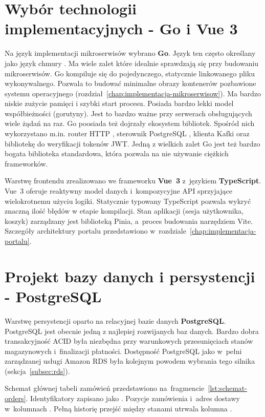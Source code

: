 \section{Wybór technologii implementacyjnych - Go i Vue 3}
\label{sec:wybor-technologii}

Na język implementacji mikroserwisów wybrano \textbf{Go}. Język ten często określany jako język chmury \parencite{medium}.
Ma wiele zalet które idealnie sprawdzają się przy budowaniu mikroserwisów. Go kompiluje się do pojedynczego,
statycznie linkowanego pliku wykonywalnego. Pozwala to budować minimalne obrazy kontenerów pozbawione systemu
operacyjnego (rozdział~\ref{chap:implementacja-mikroserwisow}). Ma bardzo niskie zużycie pamięci i szybki start procesu.
Posiada bardzo lekki model współbieżności (gorutyny). Jest to bardzo ważne przy serwerach obsługujących wiele żądań na raz.
Go poosiada też dojrzały ekosystem bibliotek. Spośród nich wykorzystano m.in. router HTTP , sterownik PostgreSQL 
, klienta Kafki  oraz bibliotekę  do weryfikacji tokenów JWT.
Jedną z wielkich zalet Go jest też bardzo bogata biblioteka standardowa, która pozwala na nie używanie ciężkich
frameworków.

Warstwę frontendu zrealizowano we frameworku \textbf{Vue~3} z~językiem \textbf{TypeScript}. Vue~3 oferuje
reaktywny model danych i~kompozycyjne API sprzyjające wielokrotnemu użyciu logiki. Statycznie typowany
TypeScript pozwala wykryć znaczną ilość błędów w etapie kompilacji. Stan aplikacji (sesja użytkownika, koszyk)
zarządzany jest biblioteką Pinia, a~proces budowania narzędziem Vite. Szczegóły architektury portalu przedstawiono
w~rozdziale~\ref{chap:implementacja-portalu}.

\section{Projekt bazy danych i persystencji - PostgreSQL}
\label{sec:projekt-bazy-danych}

Warstwę persystencji oparto na relacyjnej bazie danych \textbf{PostgreSQL}. PostgreSQL jest obecnie jedną z najlepiej
rozwijanych baz danych. Bardzo dobra transakcyjność ACID była niezbędna przy warunkowych przesunięciach 
stanów magazynowych i~finalizacji płatności. Dostępność PostgreSQL jako w~pełni zarządzanej usługi Amazon RDS
była kolejnym powodem wybrania tego silnika (sekcja~\ref{subsec:rds}).

Schemat głównej tabeli zamówień przedstawiono na~fragmencie~\ref{lst:schemat-orders}. Identyfikatory zapisano jako
. Pozycje zamówienia i~adres dostawy w~kolumnach . Pełną historię przejść między stanami
utrwala kolumna .

